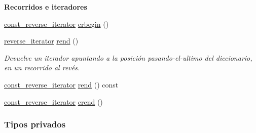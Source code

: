 \begin{Indent}{\bf Recorridos e iteradores}
\begin{DoxyCompactItemize}
\item 
\hyperlink{classaed2_1_1map_aed66a216549d13078a3ea6978ea0b768_aed66a216549d13078a3ea6978ea0b768}{const\+\_\+reverse\+\_\+iterator} \hyperlink{classaed2_1_1map_a6ad62765a2b2e00247b9e35a7542b448_a6ad62765a2b2e00247b9e35a7542b448}{crbegin} ()
\item 
\hyperlink{classaed2_1_1map_a8e6a592062260177fd73b2f9897b1dd5_a8e6a592062260177fd73b2f9897b1dd5}{reverse\+\_\+iterator} \hyperlink{classaed2_1_1map_a277f03b4f4b6b98879e4e4921081801f_a277f03b4f4b6b98879e4e4921081801f}{rend} ()
\begin{DoxyCompactList}\small\item\em Devuelve un iterador apuntando a la posición pasando-\/el-\/ultimo del diccionario, en un recorrido al revés. \end{DoxyCompactList}\item 
\hyperlink{classaed2_1_1map_aed66a216549d13078a3ea6978ea0b768_aed66a216549d13078a3ea6978ea0b768}{const\+\_\+reverse\+\_\+iterator} \hyperlink{classaed2_1_1map_aafce6e53c53c460897613747fec89f9d_aafce6e53c53c460897613747fec89f9d}{rend} () const 
\item 
\hyperlink{classaed2_1_1map_aed66a216549d13078a3ea6978ea0b768_aed66a216549d13078a3ea6978ea0b768}{const\+\_\+reverse\+\_\+iterator} \hyperlink{classaed2_1_1map_a40933b2efe1cb479de9195ea947244d1_a40933b2efe1cb479de9195ea947244d1}{crend} ()
\end{DoxyCompactItemize}
\end{Indent}
\subsubsection*{Tipos privados}
